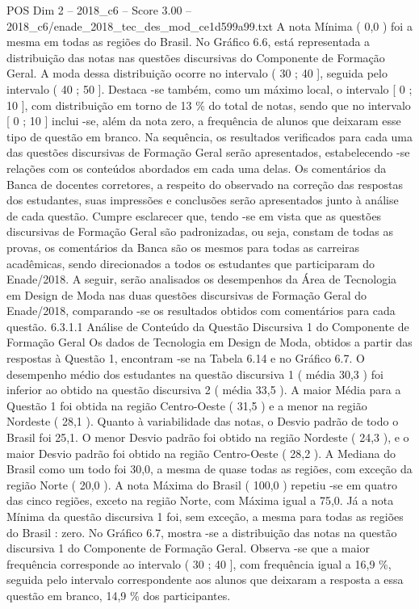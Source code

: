 \begin{textsample}{POS Dim 2 – 2018\_c6 – Score 3.00 – 2018\_c6/enade\_2018\_tec\_des\_mod\_ce1d599a99.txt}
A nota Mínima ( 0,0 ) foi a mesma em todas as regiões do Brasil.
No Gráfico 6.6, está representada a distribuição das notas nas questões discursivas do Componente de Formação Geral.
A moda dessa distribuição ocorre no intervalo ( 30 ; 40 ], seguida pelo intervalo ( 40 ; 50 ].
Destaca -se também, como um máximo local, o intervalo [ 0 ; 10 ], com distribuição em torno de 13 \% do total de notas, sendo que no intervalo [ 0 ; 10 ] inclui -se, além da nota zero, a frequência de alunos que deixaram esse tipo de questão em branco.
Na sequência, os resultados verificados para cada uma das questões discursivas de Formação Geral serão apresentados, estabelecendo -se relações com os conteúdos abordados em cada uma delas.
Os comentários da Banca de docentes corretores, a respeito do observado na correção das respostas dos estudantes, suas impressões e conclusões serão apresentados junto à análise de cada questão.
Cumpre esclarecer que, tendo -se em vista que as questões discursivas de Formação Geral são padronizadas, ou seja, constam de todas as provas, os comentários da Banca são os mesmos para todas as carreiras acadêmicas, sendo direcionados a todos os estudantes que participaram do Enade/2018.
A seguir, serão analisados os desempenhos da Área de Tecnologia em Design de Moda nas duas questões discursivas de Formação Geral do Enade/2018, comparando -se os resultados obtidos com comentários para cada questão. 6.3.1.1 Análise de Conteúdo da Questão Discursiva 1 do Componente de Formação Geral Os dados de Tecnologia em Design de Moda, obtidos a partir das respostas à Questão 1, encontram -se na Tabela 6.14 e no Gráfico 6.7.
O desempenho médio dos estudantes na questão discursiva 1 ( média 30,3 ) foi inferior ao obtido na questão discursiva 2 ( média 33,5 ).
A maior Média para a Questão 1 foi obtida na região Centro-Oeste ( 31,5 ) e a menor na região Nordeste ( 28,1 ).
Quanto à variabilidade das notas, o Desvio padrão de todo o Brasil foi 25,1.
O menor Desvio padrão foi obtido na região Nordeste ( 24,3 ), e o maior Desvio padrão foi obtido na região Centro-Oeste ( 28,2 ).
A Mediana do Brasil como um todo foi 30,0, a mesma de quase todas as regiões, com exceção da região Norte ( 20,0 ).
A nota Máxima do Brasil ( 100,0 ) repetiu -se em quatro das cinco regiões, exceto na região Norte, com Máxima igual a 75,0.
Já a nota Mínima da questão discursiva 1 foi, sem exceção, a mesma para todas as regiões do Brasil : zero.
No Gráfico 6.7, mostra -se a distribuição das notas na questão discursiva 1 do Componente de Formação Geral.
Observa -se que a maior frequência corresponde ao intervalo ( 30 ; 40 ], com frequência igual a 16,9 \%, seguida pelo intervalo correspondente aos alunos que deixaram a resposta a essa questão em branco, 14,9 \% dos participantes.

\end{textsample}
